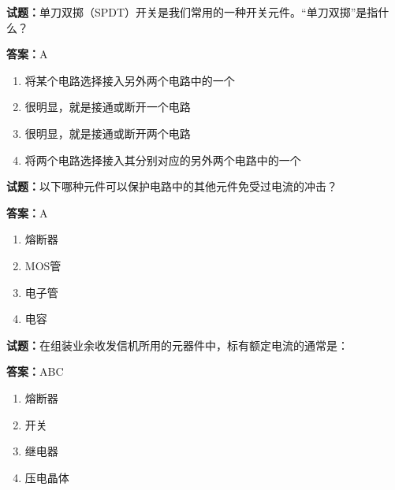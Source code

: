 \documentclass{ctexbook}
\begin{document}




\vspace{1em}

\textbf{试题：}单刀双掷（SPDT）开关是我们常用的一种开关元件。“单刀双掷”是指什么？ 

\textbf{答案：}A 

\begin{enumerate}[leftmargin=3em]
  \item 将某个电路选择接入另外两个电路中的一个 

  \item 很明显，就是接通或断开一个电路 

  \item 很明显，就是接通或断开两个电路 

  \item 将两个电路选择接入其分别对应的另外两个电路中的一个 

\end{enumerate}





\vspace{1em}

\textbf{试题：}以下哪种元件可以保护电路中的其他元件免受过电流的冲击？ 

\textbf{答案：}A 

\begin{enumerate}[leftmargin=3em]
  \item 熔断器 

  \item MOS管 

  \item 电子管 

  \item 电容 

\end{enumerate}





\vspace{1em}

\textbf{试题：}在组装业余收发信机所用的元器件中，标有额定电流的通常是： 

\textbf{答案：}ABC 

\begin{enumerate}[leftmargin=3em]
  \item 熔断器 

  \item 开关 

  \item 继电器 

  \item 压电晶体 

\end{enumerate}
\end{document}
